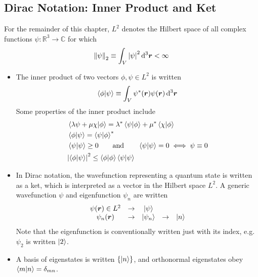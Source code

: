 \documentclass[11pt, a4paper]{article}
\newcommand{\diff}{\mathop{}\!\mathrm{d}} %
\newcommand{\dr}{\diff^{3} \r}  %
\newcommand{\eqtext}[1]{\qquad \text{#1} \qquad}
\renewcommand{\vec}[1]{\bm{#1}} %
\renewcommand{\r}{\vec{r}}  %
\newcommand{\p}{\psi}  %
\begin{document}
\subsection{Dirac Notation: Inner Product and Ket}
For the remainder of this chapter, $ L^{2} $ denotes the Hilbert space of all complex functions $ \psi : \mathbb{R}^{3} \to \mathbb{C} $ for which
\begin{equation*}
	\norm{\psi}_{2} \equiv \int_{V} \abs{\psi}^{2} \dr < \infty
\end{equation*}
\begin{itemize}
	\item The inner product of two vectors $ \phi, \psi \in L^{2} $ is written
	\begin{equation*}
		\braket{\phi}{\psi} \equiv \int_{V}\psi^{*}(\r)\psi(\r)\dr
	\end{equation*}
	Some properties of the inner product include
	\begin{align*}
		& \braket{\lambda \psi + \mu \chi}{\phi} = \lambda^{*} \braket{\psi}{\phi} + \mu^{*} \braket{\chi}{\phi}\\
		&\braket{\phi}{\psi} = \braket{\psi}{\phi}^{*}\\
		& \braket{\psi}{\psi} \geq 0 \eqtext{and} \braket{\psi}{\psi} = 0 \iff \psi \equiv 0 \\
		&\abs{\braket{\phi}{\psi}}^{2} \leq \braket{\phi}{\phi}\braket{\p}{\p}
	\end{align*}
	
	\item In Dirac notation, the wavefunction representing a quantum state is written as a ket, which is interpreted as a vector in the Hilbert space $ L^{2} $. A generic wavefunction $ \psi $ and eigenfunction $ \psi_{n} $ are written
	\begin{equation*}
		\begin{array}{ccccc}
			\psi(\r) \in L^{2} & \to & \ket{\p} & & \\
			\psi_{n}(\r) & \to  & \ket{\psi_{n}} & \to & \ket{n}\\
		\end{array}
	\end{equation*}
	Note that the eigenfunction is conventionally written just with its index, e.g. $ \psi_{2} $ is written $ \ket{2} $.
	
	\item A basis of eigenstates is written $ \{\ket{n}\} $, and orthonormal eigenstates obey $ \braket{m}{n} = \delta_{mn} $. 
		
\end{itemize}
\end{document}
